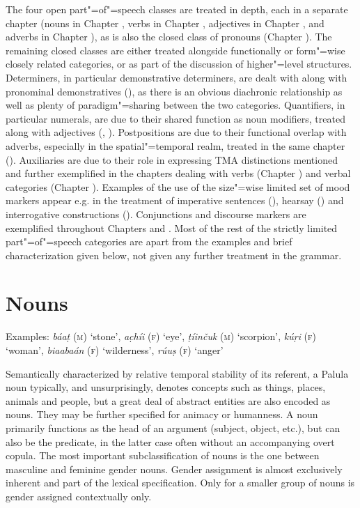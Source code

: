 The four open part"=of"=speech classes are treated in depth, each in a separate chapter (nouns in Chapter , verbs in Chapter , adjectives in Chapter , and adverbs in Chapter ), as is also the closed class of pronouns (Chapter ). The remaining closed classes are either treated alongside functionally or form"=wise closely related categories, or as part of the discussion of higher"=level structures. Determiners, in particular demonstrative determiners, are dealt with along with pronominal demonstratives (), as there is an obvious diachronic relationship as well as plenty of paradigm"=sharing between the two categories. Quantifiers, in particular numerals, are due to their shared function as noun modifiers, treated along with adjectives (, ). Postpositions are due to their functional overlap with adverbs, especially in the spatial"=temporal realm, treated in the same chapter (). Auxiliaries are due to their role in expressing TMA distinctions mentioned and further exemplified in the chapters dealing with verbs (Chapter ) and verbal categories (Chapter ). Examples of the use of the size"=wise limited set of mood markers appear e.g. in the treatment of imperative sentences (), hearsay () and interrogative constructions (). Conjunctions and discourse markers are exemplified throughout Chapters  and . Most of the rest of the strictly limited part"=of"=speech categories are apart from the examples and brief characterization given below, not given any further treatment in the grammar.


\section{Nouns}
\label{sec:3b-2}

Examples: \textit{báaṭ} (\textsc{m}) `stone', \textit{ac̣híi} (\textsc{f}) `eye', \textit{ṭíinčuk} (\textsc{m}) `scorpion', \textit{kúṛi} (\textsc{f}) `woman',  \textit{biaabaán} (\textsc{f}) `wilderness', \textit{rúuṣ} (\textsc{f}) `anger'


Semantically characterized by relative temporal stability of its referent, a Palula noun typically, and unsurprisingly, denotes concepts such as things, places, animals and people, but a great deal of abstract entities are also encoded as nouns. They may be further specified for animacy or humanness. A noun primarily functions as the head of an argument (subject, object, etc.), but can also be the predicate, in the latter case often without an accompanying overt copula. The most important subclassification of nouns is the one between masculine and feminine gender nouns. Gender assignment is almost exclusively inherent and part of the lexical specification. Only for a smaller group of nouns is gender assigned contextually only.


